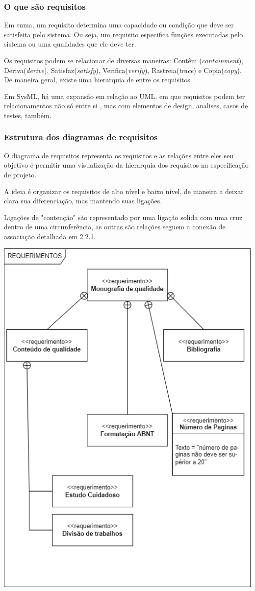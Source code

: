 
\subsubsection{O que são requisitos}

Em suma, um requisito determina uma capacidade ou condição que deve ser satisfeita pelo sistema. Ou seja, um requisito especifica funções executadas pelo sistema ou uma qualidades que ele deve ter.

Os requisitos podem se relacionar de diversas maneiras:  Contêm (\textit{containment}), Deriva(\textit{derive}), Satisfaz(\textit{satisfy}), Verifica(\textit{verify}), Rastreia(\textit{trace}) e Copia(\textit{copy}). De maneira geral, existe uma hierarquia de entre os requisitos.

Em SysML, há uma expansão em relação ao UML, em que requisitos podem ter relacionamentos não só entre si , mas com elementos de design, analises, casos de testes, também. 


\subsubsection{Estrutura dos diagramas de requisitos}
O diagrama de requisitos representa os requisitos e as relações entre eles seu objetivo é permitir uma visualização da hierarquia dos requisitos na especificação de projeto. 

A ideia é organizar os requisitos de alto nível e baixo nível, de maneira a deixar clara sua diferenciação, mas mantendo suas ligações. 

 Ligações de "contenção" são representado por uma ligação solida com uma cruz dentro de uma circunferência, as outras são relações seguem a conexão de associação detalhada em 2.2.1.

\includegraphics[width=\textwidth/2,height=\textheight,keepaspectratio]{figures/diagrama de requistos exemplo 1.png}
